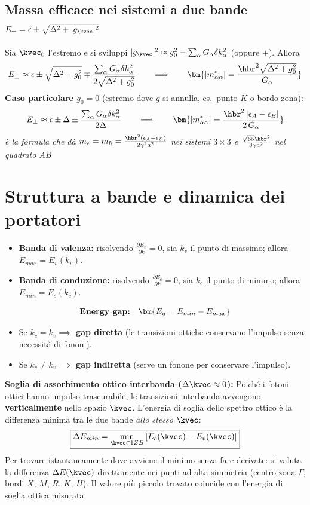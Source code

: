 \subsection{Massa efficace nei sistemi a due bande $E_\pm = \bar\epsilon\pm\sqrt{\Delta^2+|g_\kvec|^2}$}
Sia $\kvec_0$ l'estremo e si sviluppi $|g_\kvec|^2 \approx g_0^2 - \sum_\alpha G_\alpha \delta k_\alpha^2$ (oppure $+$). Allora
\[ E_\pm \approx \bar\epsilon \pm\sqrt{\Delta^2+g_0^2} \mp \frac{\sum_\alpha G_\alpha\delta k_\alpha^2}{2\sqrt{\Delta^2+g_0^2}}
   \qquad\Longrightarrow\qquad
   \bm{|m^*_{\alpha\alpha}| = \frac{\hbr^2\sqrt{\Delta^2+g_0^2}}{G_\alpha}} \]
\textbf{Caso particolare $g_0=0$} (estremo dove $g$ si annulla, es.\ punto $K$ o bordo zona):
\[ E_\pm \approx \bar\epsilon\pm\Delta \pm \frac{\sum_\alpha G_\alpha \delta k_\alpha^2}{2\Delta}
   \qquad\Longrightarrow\qquad
   \bm{|m^*_{\alpha\alpha}| = \frac{\hbr^2\,|\epsilon_A-\epsilon_B|}{2\,G_\alpha}} \]
\textit{è la formula che dà $m_e=m_h=\frac{\hbr^2(\epsilon_A-\epsilon_B)}{2\gamma^2a^2}$ nei sistemi $3\times3$ e $\frac{\sqrt{65}\hbr^2}{8\gamma a^2}$ nel quadrato AB}

\newpage

\section{Struttura a bande e dinamica dei portatori}
\begin{itemize}
    \item \textbf{Banda di valenza:} risolvendo $\frac{\partial E_v}{\partial k}=0$, sia $k_v$ il punto di massimo; allora $E_{max}=E_v(k_v)$.
    \item \textbf{Banda di conduzione:} risolvendo $\frac{\partial E_c}{\partial k}=0$, sia $k_c$ il punto di minimo; allora $E_{min}=E_c(k_c)$.
\end{itemize}
\[\text{\textbf{Energy gap:}} \quad \bm{E_g = E_{min}-E_{max}}\]
\begin{itemize}
    \item Se $k_c = k_v \implies$ \textbf{gap diretta} (le transizioni ottiche conservano l'impulso senza necessità di fononi).
    \item Se $k_c \neq k_v \implies$ \textbf{gap indiretta} (serve un fonone per conservare l'impulso).
\end{itemize}

\vspace{0.3cm}
\textbf{Soglia di assorbimento ottico interbanda ($\Delta\kvec\approx0$):} Poiché i fotoni ottici hanno impulso trascurabile, le transizioni interbanda avvengono \textbf{verticalmente} nello spazio $\kvec$. L'energia di soglia dello spettro ottico è la differenza minima tra le due bande \emph{allo stesso} $\kvec$:
\[ \boxed{\Delta E_{min} = \min_{\kvec\in1ZB}\left[E_c(\kvec)-E_v(\kvec)\right]} \]
Per trovare istantaneamente dove avviene il minimo senza fare derivate: si valuta la differenza $\Delta E(\kvec)$ direttamente nei punti ad alta simmetria (centro zona $\Gamma$, bordi $X$, $M$, $R$, $K$, $H$). Il valore più piccolo trovato coincide con l'energia di soglia ottica misurata.


